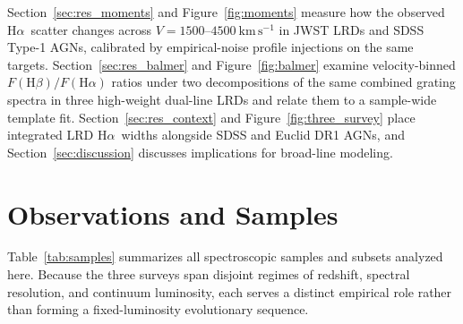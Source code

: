 \documentclass[twocolumn]{aastex631}
\newcommand{\Ha}{\ensuremath{\mathrm{H}\alpha}}
\newcommand{\Hb}{\ensuremath{\mathrm{H}\beta}}
\newcommand{\kms}{\ensuremath{\mathrm{km\,s^{-1}}}}
\begin{document}
Section~\ref{sec:res_moments} and Figure~\ref{fig:moments} measure how the observed \Ha\ scatter changes across $V = 1500$--$4500~\kms$ in JWST LRDs and SDSS Type-1 AGNs, calibrated by empirical-noise profile injections on the same targets. Section~\ref{sec:res_balmer} and Figure~\ref{fig:balmer} examine velocity-binned $F(\Hb)/F(\Ha)$ ratios under two decompositions of the same combined grating spectra in three high-weight dual-line LRDs and relate them to a sample-wide template fit. Section~\ref{sec:res_context} and Figure~\ref{fig:three_survey} place integrated LRD \Ha\ widths alongside SDSS and Euclid DR1 AGNs, and Section~\ref{sec:discussion} discusses implications for broad-line modeling.

\section{Observations and Samples}
\label{sec:samples}

Table~\ref{tab:samples} summarizes all spectroscopic samples and subsets analyzed here. Because the three surveys span disjoint regimes of redshift, spectral resolution, and continuum luminosity, each serves a distinct empirical role rather than forming a fixed-luminosity evolutionary sequence.
\end{document}
